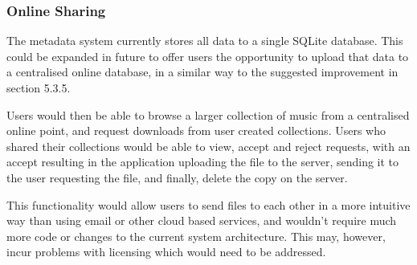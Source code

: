\subsubsection{Online Sharing}
The metadata system currently stores all data to a single SQLite database. This could be expanded in future to offer users the opportunity to upload that data to a centralised online database, in a similar way to the suggested improvement in section 5.3.5.

Users would then be able to browse a larger collection of music from a centralised online point, and request downloads from user created collections. Users who shared their collections would be able to view, accept and reject requests, with an accept resulting in the application uploading the file to the server, sending it to the user requesting the file, and finally, delete the copy on the server.

This functionality would allow users to send files to each other in a more intuitive way than using email or other cloud based services, and wouldn't require much more code or changes to the current system architecture. This may, however, incur problems with licensing which would need to be addressed.
